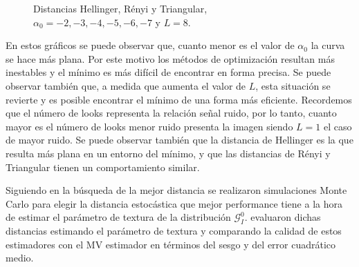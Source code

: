 \begin{figure}[hbt]
	\centering    
	\caption{\label{DistL8}\small Distancias Hellinger, Rényi y Triangular, $\alpha_0= -2,-3,-4,-5,-6,-7$ y $L=8$.}
\end{figure}

En estos gráficos se puede observar que, cuanto menor es el valor de $\alpha_0$ la curva se hace más plana. Por este motivo los métodos de optimización resultan más inestables y el mínimo es más difícil de encontrar en forma precisa. Se puede observar también que, a medida que aumenta el valor de $L$, esta situación se revierte y es posible encontrar el mínimo de una forma más eficiente. Recordemos que el número de looks representa la relación señal ruido, por lo tanto, cuanto mayor es el número de looks menor ruido presenta la imagen siendo $L=1$ el caso de mayor ruido. Se puede observar también que la distancia de Hellinger es la que resulta más plana en un entorno del mínimo, y que las distancias de Rényi y Triangular tienen un comportamiento similar.

Siguiendo en la búsqueda de la mejor distancia se realizaron simulaciones Monte Carlo para elegir la distancia estocástica que mejor performance tiene a la hora de estimar el parámetro de textura de la distribución $\mathcal{G}_I^0$. \citet{cassettiast2013} evaluaron dichas distancias estimando el parámetro de textura y  comparando la calidad de estos estimadores con el MV estimador en términos del sesgo y del error cuadrático medio. 

